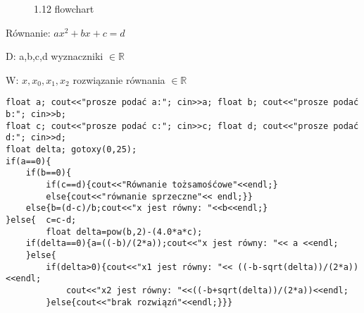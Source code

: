 \documentclass[a4paper,11pt]{article}
\begin{document}
\begin{multicols}{2}
\begin{flushleft}
\begin{figure}[H]
\caption{1.12 flowchart}
\label{flow12}
\end{figure}
\end{flushleft}
Równanie: $ax^2+bx+c=d$

D: a,b,c,d wyznaczniki $\in \mathbb R$ 

W: $x, x_0,x_1,x_2$ rozwiązanie równania $\in \mathbb{R}$  
\end{multicols}
\begin{flushright}
\begin{verbatim}
float a; cout<<"prosze podać a:"; cin>>a; float b; cout<<"prosze podać b:"; cin>>b;
float c; cout<<"prosze podać c:"; cin>>c; float d; cout<<"prosze podać d:"; cin>>d;
float delta; gotoxy(0,25);
if(a==0){
	if(b==0){
		if(c==d){cout<<"Równanie tożsamośćowe"<<endl;}
		else{cout<<"równanie sprzeczne"<< endl;}}
	else{b=(d-c)/b;cout<<"x jest równy: "<<b<<endl;}
}else{  c=c-d;
        float delta=pow(b,2)-(4.0*a*c);
	if(delta==0){a=((-b)/(2*a));cout<<"x jest równy: "<< a <<endl;
	}else{
		if(delta>0){cout<<"x1 jest równy: "<< ((-b-sqrt(delta))/(2*a))<<endl;
			cout<<"x2 jest równy: "<<((-b+sqrt(delta))/(2*a))<<endl;
		}else{cout<<"brak rozwiązń"<<endl;}}}
\end{verbatim}
\end{flushright}
\end{document}
